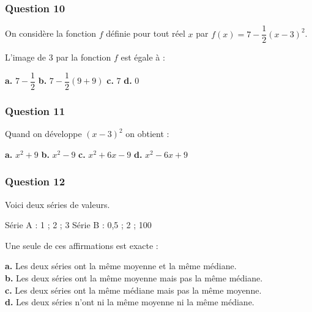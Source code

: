 \documentclass[10pt]{article}
\begin{document}
\subsubsection*{Question 10}
On considère la fonction $f$ définie pour tout réel $x$ par $f(x) = 7 - \dfrac{1}{2}(x - 3)^2$.

L'image de 3 par la fonction $f$ est égale à :

\textbf{a.} $7 - \dfrac{1}{2}$ \hfill \textbf{b.} $7 - \dfrac{1}{2}(9 + 9)$ \hfill 
\textbf{c.} $7$ \hfill \textbf{d.} $0$

\subsubsection*{Question 11}
Quand on développe $(x - 3)^2$ on obtient :

\textbf{a.} $x^2 + 9$ \hfill \textbf{b.} $x^2 - 9$ \hfill 
\textbf{c.} $x^2 + 6x - 9$ \hfill \textbf{d.} $x^2 - 6x + 9$

\subsubsection*{Question 12}
Voici deux séries de valeurs.

Série A : 1 ; 2 ; 3 \hfill Série B : 0,5 ; 2 ; 100

Une seule de ces affirmations est exacte :

\textbf{a.} Les deux séries ont la même moyenne et la même médiane. \\
\textbf{b.} Les deux séries ont la même moyenne mais pas la même médiane. \\
\textbf{c.} Les deux séries ont la même médiane mais pas la même moyenne. \\
\textbf{d.} Les deux séries n'ont ni la même moyenne ni la même médiane.
\end{document}
